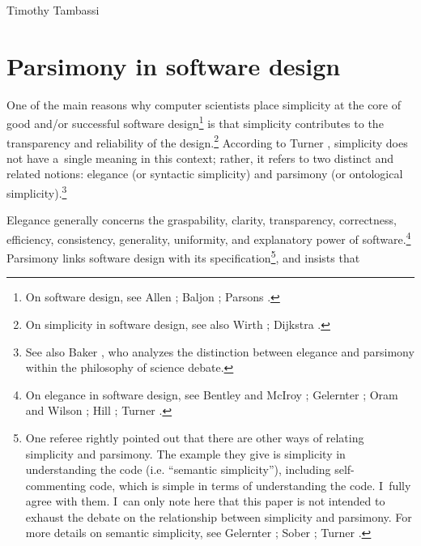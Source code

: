 \begin{artengenv}{Timothy Tambassi}
\section{Parsimony in software design}

One of the main reasons why computer scientists place simplicity at the core of good and/or successful software design\footnote{On software design, see Allen 
\parencite*[][]{allen_formal_1997}; %
 Baljon 
\parencite*[][]{baljon_history_2002}; %
 Parsons 
\parencite*[][]{parsons_philosophy_2015}.%
} is that simplicity contributes to the transparency and reliability of the design.\footnote{On simplicity in software design, see also Wirth 
\parencite*[][]{wirth_design_1974}; %
 Dijkstra 
\parencite*[][]{yourdon_humble_1979}.%
} According to Turner 
\parencite*[][pp.133–134]{turner_computational_2018}, %
 simplicity does not have a~single meaning in this context; rather, it refers to two distinct and related notions: elegance (or syntactic simplicity) and parsimony (or ontological simplicity).\footnote{See also Baker 
\parencite*[][]{baker_simplicity_2016}, %
 who analyzes the distinction between elegance and parsimony within the philosophy of science debate. }



Elegance generally concerns the graspability, clarity, transparency, correctness, efficiency, consistency, generality, uniformity, and explanatory power of software.\footnote{On elegance in software design, see Bentley and McIroy 
\parencite*[][]{bentley_engineering_1993}; %
 Gelernter 
\parencite*[][]{gelernter_machine_1998}; %
 Oram and Wilson 
\parencite*[][]{oram_beautiful_2007}; %
 Hill 
\parencite*[][]{de_mol_elegance_2018}; %
 Turner 
\parencite*[][]{turner_computational_2018}.%
} Parsimony links software design with its specification\footnote{One referee rightly pointed out that there are other ways of relating simplicity and parsimony. The example they give is simplicity in understanding the code (i.e. ``semantic simplicity''), including self-commenting code, which is simple in terms of understanding the code. I~fully agree with them. I~can only note here that this paper is not intended to exhaust the debate on the relationship between simplicity and parsimony. For more details on semantic simplicity, see Gelernter 
\parencite*[][]{gelernter_machine_1998}; %
 Sober 
\parencite*[][]{sober_what_2002}; %
 Turner 
\parencite*[][]{turner_computational_2018}.%
}, and insists that




\end{artengenv}
